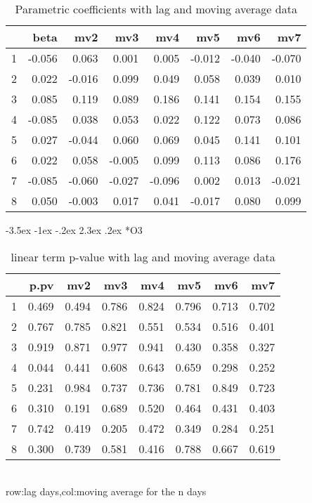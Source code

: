 \documentclass[a4paper, 12pt]{article}
\makeatletter
\def\large{\fontsize{14}{20}\selectfont}
\renewcommand\subsection{\@startsection {subsection}{1}{\z@}%
                                   {-3.5ex \@plus -1ex \@minus -.2ex}%
                                   {2.3ex \@plus.2ex}%
                                   {\centering\normalfont\large\bfseries}}
\makeatother
\begin{document}
\begin{table}[h]
\centering
\caption{Parametric coefficients with lag and moving average data}
\begin{tabular}{rrrrrrrr}
  \hline
 & beta & mv2 & mv3 & mv4 & mv5 & mv6 & mv7 \\
  \hline
1 & -0.056 & 0.063 & 0.001 & 0.005 & -0.012 & -0.040 & -0.070 \\
  2 & 0.022 & -0.016 & 0.099 & 0.049 & 0.058 & 0.039 & 0.010 \\
  3 & 0.085 & 0.119 & 0.089 & 0.186 & 0.141 & 0.154 & 0.155 \\
  4 & -0.085 & 0.038 & 0.053 & 0.022 & 0.122 & 0.073 & 0.086 \\
  5 & 0.027 & -0.044 & 0.060 & 0.069 & 0.045 & 0.141 & 0.101 \\
  6 & 0.022 & 0.058 & -0.005 & 0.099 & 0.113 & 0.086 & 0.176 \\
  7 & -0.085 & -0.060 & -0.027 & -0.096 & 0.002 & 0.013 & -0.021 \\
  8 & 0.050 & -0.003 & 0.017 & 0.041 & -0.017 & 0.080 & 0.099 \\
   \hline
\end{tabular}
\end{table}
\clearpage
\subsection*{O3}
\begin{table}[h]
\centering
\caption{linear term p-value with lag and moving average data}
\begin{tabular}{rrrrrrrr}
  \hline
 & p.pv & mv2 & mv3 & mv4 & mv5 & mv6 & mv7 \\
  \hline
1 & 0.469 & 0.494 & 0.786 & 0.824 & 0.796 & 0.713 & 0.702 \\
  2 & 0.767 & 0.785 & 0.821 & 0.551 & 0.534 & 0.516 & 0.401 \\
  3 & 0.919 & 0.871 & 0.977 & 0.941 & 0.430 & 0.358 & 0.327 \\
  4 & 0.044 & 0.441 & 0.608 & 0.643 & 0.659 & 0.298 & 0.252 \\
  5 & 0.231 & 0.984 & 0.737 & 0.736 & 0.781 & 0.849 & 0.723 \\
  6 & 0.310 & 0.191 & 0.689 & 0.520 & 0.464 & 0.431 & 0.403 \\
  7 & 0.742 & 0.419 & 0.205 & 0.472 & 0.349 & 0.284 & 0.251 \\
  8 & 0.300 & 0.739 & 0.581 & 0.416 & 0.788 & 0.667 & 0.619 \\
   \hline
\end{tabular}
\\row:lag days,col:moving average for the n days
\end{table}
\end{document}
